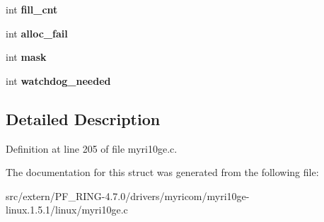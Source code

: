 \begin{DoxyCompactItemize}
\item 
\hypertarget{structmyri10ge__rx__buf_a30e5b9181ab29402a3ef850c20473b44}{
int {\bfseries fill\_\-cnt}}
\label{structmyri10ge__rx__buf_a30e5b9181ab29402a3ef850c20473b44}

\item 
\hypertarget{structmyri10ge__rx__buf_afd9065ad5b73a86db6df0ad57535bffb}{
int {\bfseries alloc\_\-fail}}
\label{structmyri10ge__rx__buf_afd9065ad5b73a86db6df0ad57535bffb}

\item 
\hypertarget{structmyri10ge__rx__buf_a47d5d443996cb456b9671e55d46a8bfa}{
int {\bfseries mask}}
\label{structmyri10ge__rx__buf_a47d5d443996cb456b9671e55d46a8bfa}

\item 
\hypertarget{structmyri10ge__rx__buf_a2586da049ffa972577440712c7e4a9d4}{
int {\bfseries watchdog\_\-needed}}
\label{structmyri10ge__rx__buf_a2586da049ffa972577440712c7e4a9d4}

\end{DoxyCompactItemize}


\subsection{Detailed Description}


Definition at line 205 of file myri10ge.c.



The documentation for this struct was generated from the following file:\begin{DoxyCompactItemize}
\item 
src/extern/PF\_\-RING-\/4.7.0/drivers/myricom/myri10ge-\/linux.1.5.1/linux/myri10ge.c\end{DoxyCompactItemize}
